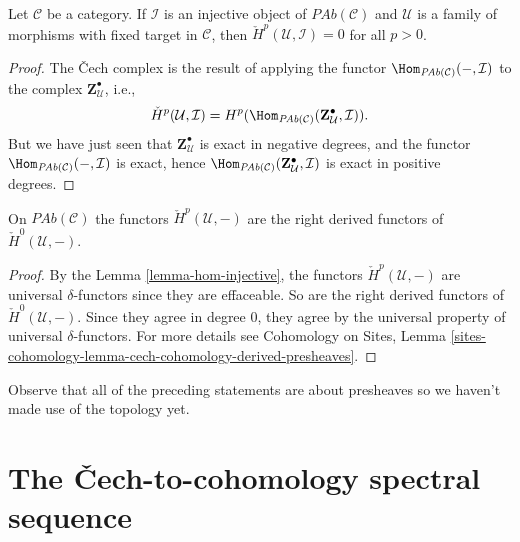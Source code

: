 \begin{lemma}
\label{lemma-hom-injective}
Let $\mathcal{C}$ be a category. If $\mathcal{I}$ is an injective object of
$\textit{PAb}(\mathcal{C})$ and $\mathcal{U}$ is a family of morphisms with
fixed target in $\mathcal{C}$, then $\check H^p(\mathcal{U}, \mathcal{I}) = 0$
for all $p > 0$.
\end{lemma}

\begin{proof}
The {\v C}ech complex is the result of applying the functor
$\Hom_{\textit{PAb}(\mathcal{C})}(-, \mathcal{I}) $ to the complex $
\mathbf{Z}^\bullet_\mathcal{U} $, i.e.,
$$
\check H^p(\mathcal{U}, \mathcal{I}) = H^p
(\Hom_{\textit{PAb}(\mathcal{C})} (\mathbf{Z}^\bullet_\mathcal{U},
\mathcal{I})).
$$
But we have just seen that $\mathbf{Z}^\bullet_\mathcal{U}$ is exact in
negative degrees, and the functor $\Hom_{\textit{PAb}(\mathcal{C})}(-,
\mathcal{I})$ is exact, hence $\Hom_{\textit{PAb}(\mathcal{C})}
(\mathbf{Z}^\bullet_\mathcal{U}, \mathcal{I})$ is exact in positive degrees.
\end{proof}

\begin{theorem}
\label{theorem-cech-derived}
On $\textit{PAb}(\mathcal{C})$ the functors $\check{H}^p(\mathcal{U}, -)$ are
the right derived functors of $\check{H}^0(\mathcal{U}, -)$.
\end{theorem}

\begin{proof}
By the Lemma \ref{lemma-hom-injective}, the functors
$\check H^p(\mathcal{U}, -)$ are universal
$\delta$-functors since they are effaceable.
So are the right derived functors of $\check H^0(\mathcal{U}, -)$. Since they
agree in degree $0$, they agree by the universal property of universal
$\delta$-functors. For more details see
Cohomology on Sites,
Lemma \ref{sites-cohomology-lemma-cech-cohomology-derived-presheaves}.
\end{proof}

\begin{remark}
\label{remark-presheaves-no-topology}
Observe that all of the preceding statements are about presheaves so we haven't
made use of the topology yet.
\end{remark}




\section{The {\v C}ech-to-cohomology spectral sequence}
\label{section-cech-ss}

